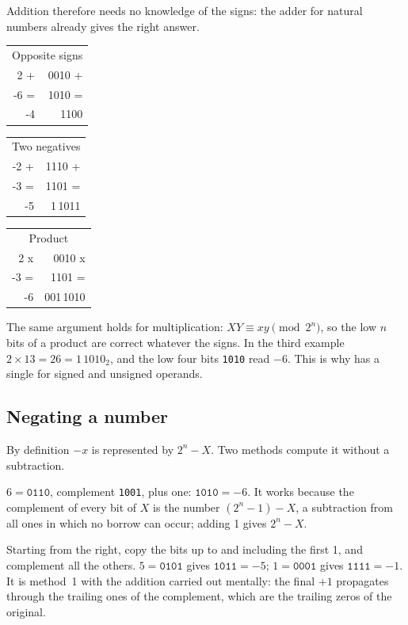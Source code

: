 \smallskip
Addition therefore needs no knowledge of the signs: the adder for natural
numbers already gives the right answer.

\begin{center}\ttfamily
\begin{tabular}{@{}r@{\quad}r@{}}
\multicolumn{2}{c}{\textsf{\small Opposite signs}}\\
2 + & 0010 +\\ -6 = & 1010 =\\\hline -4 & 1100
\end{tabular}\qquad\qquad
\begin{tabular}{@{}r@{\quad}r@{}}
\multicolumn{2}{c}{\textsf{\small Two negatives}}\\
-2 + & 1110 +\\ -3 = & 1101 =\\\hline -5 & \textcolor{prgcomment}{1}\,1011
\end{tabular}\qquad\qquad
\begin{tabular}{@{}r@{\quad}r@{}}
\multicolumn{2}{c}{\textsf{\small Product}}\\
2 x & 0010 x\\ -3 = & 1101 =\\\hline -6 & \textcolor{prgcomment}{001}\,1010
\end{tabular}
\end{center}

The same argument holds for multiplication: $XY\equiv xy\pmod{2^{n}}$, so the
low $n$ bits of a product are correct whatever the signs. In the third
example $2\times 13 = 26 = 1\,1010_2$, and the low four bits \texttt{1010}
read $-6$. This is why \riscv has a single  for signed and unsigned
operands.

\subsection{Negating a number}

By definition $-x$ is represented by $2^{n}-X$. Two methods compute it
without a subtraction.

\begin{description}[style=nextline,leftmargin=1.5em]
\item[Method 1: complement every bit, then add 1.]
  $6=\texttt{0110}$, complement \texttt{1001}, plus one: $\texttt{1010}=-6$.
  It works because the complement of every bit of $X$ is the number
  $(2^{n}-1)-X$, a subtraction from all ones in which no borrow can occur;
  adding 1 gives $2^{n}-X$.
\item[Method 2: scan from the right.] Starting from the right, copy the bits
  up to and including the first 1, and complement all the others.
  $5=\texttt{0101}$ gives $\texttt{1011}=-5$; $1=\texttt{0001}$ gives
  $\texttt{1111}=-1$. It is method~1 with the addition carried out mentally:
  the final $+1$ propagates through the trailing ones of the complement, which
  are the trailing zeros of the original.
\end{description}

